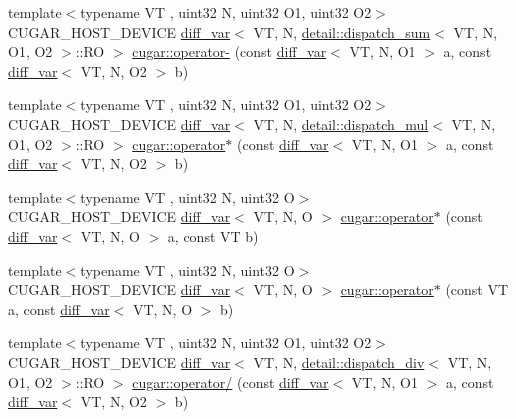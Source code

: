\begin{DoxyCompactItemize}
\item 
{\footnotesize template$<$typename VT , uint32 N, uint32 O1, uint32 O2$>$ }\\C\+U\+G\+A\+R\+\_\+\+H\+O\+S\+T\+\_\+\+D\+E\+V\+I\+CE \hyperlink{structcugar_1_1diff__var}{diff\+\_\+var}$<$ VT, N, \hyperlink{structcugar_1_1detail_1_1dispatch__sum}{detail\+::dispatch\+\_\+sum}$<$ VT, N, O1, O2 $>$\+::RO $>$ \hyperlink{group___auto_diff_module_ga19939d139dd82ec7e4bc93925af5b2d0}{cugar\+::operator-\/} (const \hyperlink{structcugar_1_1diff__var}{diff\+\_\+var}$<$ VT, N, O1 $>$ a, const \hyperlink{structcugar_1_1diff__var}{diff\+\_\+var}$<$ VT, N, O2 $>$ b)
\item 
{\footnotesize template$<$typename VT , uint32 N, uint32 O1, uint32 O2$>$ }\\C\+U\+G\+A\+R\+\_\+\+H\+O\+S\+T\+\_\+\+D\+E\+V\+I\+CE \hyperlink{structcugar_1_1diff__var}{diff\+\_\+var}$<$ VT, N, \hyperlink{structcugar_1_1detail_1_1dispatch__mul}{detail\+::dispatch\+\_\+mul}$<$ VT, N, O1, O2 $>$\+::RO $>$ \hyperlink{group___auto_diff_module_ga1c7e88173ec4218a2a3f7545bc60c665}{cugar\+::operator$\ast$} (const \hyperlink{structcugar_1_1diff__var}{diff\+\_\+var}$<$ VT, N, O1 $>$ a, const \hyperlink{structcugar_1_1diff__var}{diff\+\_\+var}$<$ VT, N, O2 $>$ b)
\item 
{\footnotesize template$<$typename VT , uint32 N, uint32 O$>$ }\\C\+U\+G\+A\+R\+\_\+\+H\+O\+S\+T\+\_\+\+D\+E\+V\+I\+CE \hyperlink{structcugar_1_1diff__var}{diff\+\_\+var}$<$ VT, N, O $>$ \hyperlink{group___auto_diff_module_ga4e23b0400e7f6f9335b35f739dcc8452}{cugar\+::operator$\ast$} (const \hyperlink{structcugar_1_1diff__var}{diff\+\_\+var}$<$ VT, N, O $>$ a, const VT b)
\item 
{\footnotesize template$<$typename VT , uint32 N, uint32 O$>$ }\\C\+U\+G\+A\+R\+\_\+\+H\+O\+S\+T\+\_\+\+D\+E\+V\+I\+CE \hyperlink{structcugar_1_1diff__var}{diff\+\_\+var}$<$ VT, N, O $>$ \hyperlink{group___auto_diff_module_gab78c0e159eab94313c80fd6c78b5a0fd}{cugar\+::operator$\ast$} (const VT a, const \hyperlink{structcugar_1_1diff__var}{diff\+\_\+var}$<$ VT, N, O $>$ b)
\item 
{\footnotesize template$<$typename VT , uint32 N, uint32 O1, uint32 O2$>$ }\\C\+U\+G\+A\+R\+\_\+\+H\+O\+S\+T\+\_\+\+D\+E\+V\+I\+CE \hyperlink{structcugar_1_1diff__var}{diff\+\_\+var}$<$ VT, N, \hyperlink{structcugar_1_1detail_1_1dispatch__div}{detail\+::dispatch\+\_\+div}$<$ VT, N, O1, O2 $>$\+::RO $>$ \hyperlink{group___auto_diff_module_gad49a1e7cc916cd560facf38a498e0ea4}{cugar\+::operator/} (const \hyperlink{structcugar_1_1diff__var}{diff\+\_\+var}$<$ VT, N, O1 $>$ a, const \hyperlink{structcugar_1_1diff__var}{diff\+\_\+var}$<$ VT, N, O2 $>$ b)

\end{DoxyCompactItemize}
